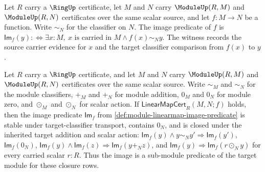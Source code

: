 \begin{definition}\label{def:module-linearmap-image-predicate} Let $R$ carry a $\RingUp$ certificate, let $M$ and $N$ carry $\ModuleUp(R,M)$ and $\ModuleUp(R,N)$ certificates over the same scalar source, and let $f:M\to N$ be a function. Write $\sim_N$ for the classifier on $N$. The image predicate of $f$ is $\mathsf{Im}_f(y):\Longleftrightarrow \exists x:M,\ x\text{ is carried in }M\land f(x)\sim_N y$. The witness records the source carrier evidence for $x$ and the target classifier comparison from $f(x)$ to $y$.
\end{definition}
\begin{theorem}\label{thm:module-linearmap-image-submodule-closure} Let $R$ carry a $\RingUp$ certificate, and let $M$ and $N$ carry $\ModuleUp(R,M)$ and $\ModuleUp(R,N)$ certificates over the same scalar source. Write $\sim_M$ and $\sim_N$ for the module classifiers, $+_M$ and $+_N$ for module addition, $0_M$ and $0_N$ for module zero, and $\odot_M$ and $\odot_N$ for scalar action. If $\mathsf{LinearMapCert}_R(M,N;f)$ holds, then the image predicate $\mathsf{Im}_f$ from \autoref{def:module-linearmap-image-predicate} is stable under target-classifier transport, contains $0_N$, and is closed under the inherited target addition and scalar action: $\mathsf{Im}_f(y)\land y\sim_N y'\Longrightarrow\mathsf{Im}_f(y')$, $\mathsf{Im}_f(0_N)$, $\mathsf{Im}_f(y)\land\mathsf{Im}_f(z)\Longrightarrow\mathsf{Im}_f(y+_N z)$, and $\mathsf{Im}_f(y)\Longrightarrow\mathsf{Im}_f(r\odot_N y)$ for every carried scalar $r:R$. Thus the image is a sub-module predicate of the target module for these closure rows.
\end{theorem}
